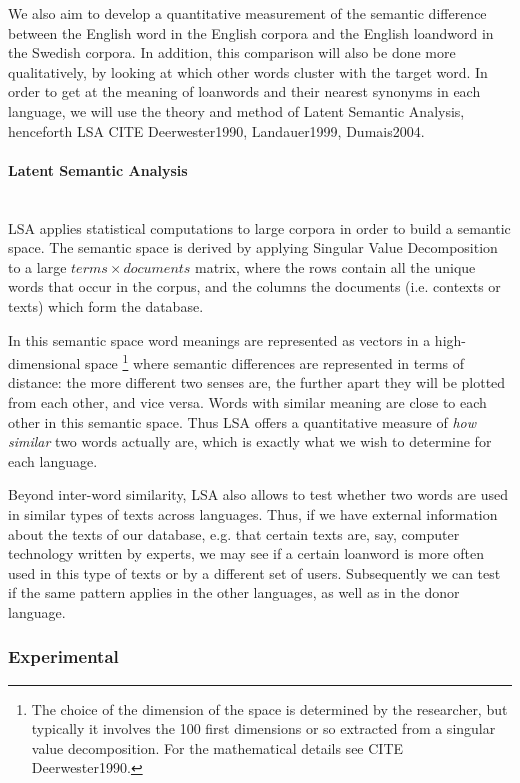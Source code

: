 \documentclass[a4paper]{article}
\begin{document}
We also aim to develop a quantitative measurement of the semantic difference between the English word in the English corpora and the English loandword in the Swedish corpora. In addition, this comparison will also be done more qualitatively, by looking at which other words cluster with the target word. 
In order to get at the meaning of loanwords and their nearest synonyms in each language, we will use the theory and method of Latent Semantic Analysis, henceforth LSA CITE {Deerwester1990, Landauer1999, Dumais2004}.

\paragraph{Latent Semantic Analysis} \hspace{0pt} \\
LSA applies statistical computations to large corpora in order to build a semantic space.
The semantic space is derived by applying Singular Value Decomposition to a large $ terms \times documents$ matrix, where the rows contain all the unique words that occur in the corpus, and the columns the documents (i.e. contexts or texts) which form the database.

In this semantic space word meanings are represented as vectors in a high-dimensional space%
\footnote{The choice of the dimension of the space is determined by the researcher, but typically it involves the 100 first dimensions or so extracted from a singular value decomposition. For the mathematical details see CITE {Deerwester1990}.} where semantic differences are represented in terms of distance: the more different two senses are, the further apart they will be plotted from each other, and vice versa. Words with similar meaning are close to each other in this semantic space.
Thus LSA offers a quantitative measure of \emph{how similar} two words actually are, which is exactly what we wish to determine for each language.

Beyond inter-word similarity, LSA also allows  to test whether two words are used in similar types of texts across languages.
Thus, if we have external information about the texts of our database, e.g. that certain texts are, say, computer technology written by experts, we may see if a certain loanword is more often used in this type of texts or by a different set of users.
Subsequently we can test if the same pattern applies in the other languages, as well as in the donor language.


\subsubsection{Experimental}
\end{document}
